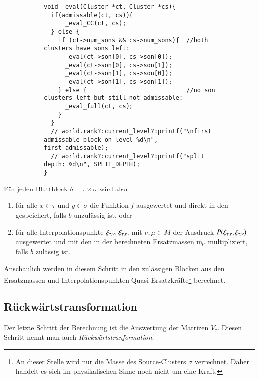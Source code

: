     \begin{figure}[tb]
    \begin{subfigure}{0.9\textwidth}
    \begin{lstlisting}[label=lst:eval, caption={Durch diese rekursive Struktur wird ein impliziter Blockbaum durchlaufen, um die Matrizen $S_b$ bzw. $N_b$ auszuwerten.}]
void _eval(Cluster *ct, Cluster *cs){
  if(admissable(ct, cs)){
      _eval_CC(ct, cs);
  } else {
    if (ct->num_sons && cs->num_sons){	//both clusters have sons left:
      _eval(ct->son[0], cs->son[0]);
      _eval(ct->son[0], cs->son[1]);
      _eval(ct->son[1], cs->son[0]);
      _eval(ct->son[1], cs->son[1]);
    } else {                          	//no son clusters left but still not admissable:
      _eval_full(ct, cs);
    }
  }
  // world.rank?:current_level?:printf("\nfirst admissable block on level %d\n", first_admissable);
  // world.rank?:current_level?:printf("split depth: %d\n", SPLIT_DEPTH);
}
    \end{lstlisting}
    \end{subfigure}
    \end{figure}
    
    Für jeden Blattblock $b = \tau \times \sigma$ wird also
    \begin{enumerate}
     \item für alle $x \in \tau$ und $y \in \sigma$ die Funktion $f$ ausgewertet und direkt in den  gespeichert, falls $b$ unzulässig ist, oder
     \item für alle Interpolationspunkte $\xi_{\tau, \nu} \text{, } \xi_{\tau, \nu}$, mit $\nu,\mu \in M$ der Ausdruck $P(\xi_{\tau, \nu} , \xi_{\tau, \nu})$ ausgewertet und mit den in der 
     \vorw berechneten Ersatzmassen $\tcode{m}_\mu$ multipliziert, falls $b$ zulässig ist.
    \end{enumerate}
    
    Anschaulich werden in diesem Schritt in den zulässigen Blöcken aus den Ersatzmassen und Interpolationspunkten Quasi-Ersatzkräfte\footnote{An dieser Stelle wird nur die 
    Masse des Source-Clusters $\sigma$ verrechnet. Daher handelt es sich im physikalischen Sinne noch nicht um eine Kraft.} berechnet. 

    \subsection{Rückwärtstransformation}
    \label{sec:rückw}
    Der letzte Schritt der Berechnung ist die Auswertung der Matrizen $V_\tau$. Diesen Schritt nennt man auch \textit{Rückwärtstranformation}.
    
